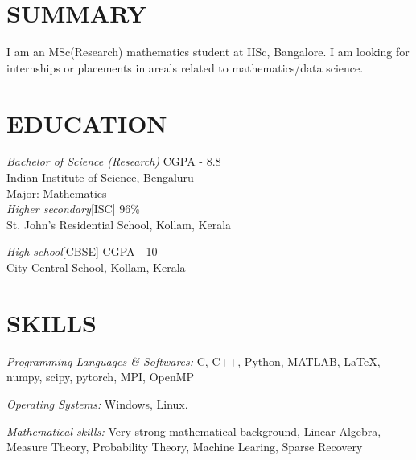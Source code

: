 \documentclass[margin, 10pt]{res} %
\begin{document}
\begin{resume}

 
\section{SUMMARY}  

	I am an MSc(Research) mathematics student at IISc, Bangalore. I am looking for internships or placements in areals related to
mathematics/data science.


\section{EDUCATION}
{\sl Bachelor of Science (Research)} \hfill CGPA - 8.8\\
Indian Institute of Science, Bengaluru\\
Major: Mathematics\\

{\sl Higher secondary}[ISC]  \hfill  96\%\\
St. John's Residential School, Kollam, Kerala

{\sl High school}[CBSE] \hfill CGPA - 10\\
City Central School, Kollam, Kerala 


\section{SKILLS} 

{\sl Programming Languages \& Softwares:} 
 C, C++, Python, MATLAB, \LaTeX, numpy, scipy, pytorch, MPI, OpenMP 

{\sl Operating Systems:} Windows, Linux.

{\sl Mathematical skills:} Very strong mathematical background, Linear Algebra,
Measure Theory, Probability Theory, Machine Learing, Sparse Recovery


\end{resume}
\end{document}
